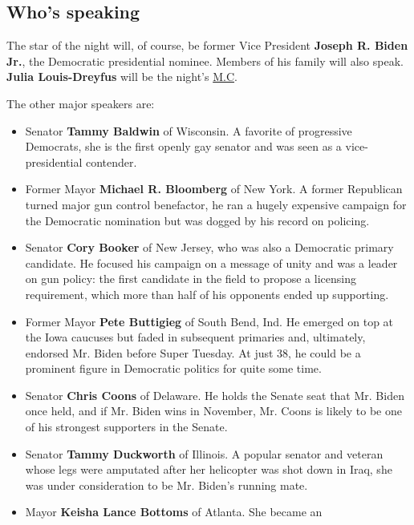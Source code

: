 \hypertarget{whos-speaking}{%
\subsection{Who's speaking}\label{whos-speaking}}

The star of the night will, of course, be former Vice President
\textbf{Joseph R. Biden Jr.}, the Democratic presidential nominee.
Members of his family will also speak. \textbf{Julia Louis-Dreyfus} will
be the night's
\href{https://www.nytimes3xbfgragh.onion/2020/08/17/us/elections/kerry-washington-julia-louis-dreyfus-eva-longoria-and-tracee-ellis-ross-will-mc-the-convention.html}{M.C}.

The other major speakers are:

\begin{itemize}
\item
  Senator \textbf{Tammy Baldwin} of Wisconsin. A favorite of progressive
  Democrats, she is the first openly gay senator and was seen as a
  vice-presidential contender.
\item
  Former Mayor \textbf{Michael R. Bloomberg} of New York. A former
  Republican turned major gun control benefactor, he ran a hugely
  expensive campaign for the Democratic nomination but was dogged by his
  record on policing.
\item
  Senator \textbf{Cory Booker} of New Jersey, who was also a Democratic
  primary candidate. He focused his campaign on a message of unity and
  was a leader on gun policy: the first candidate in the field to
  propose a licensing requirement, which more than half of his opponents
  ended up supporting.
\item
  Former Mayor \textbf{Pete Buttigieg} of South Bend, Ind. He emerged on
  top at the Iowa caucuses but faded in subsequent primaries and,
  ultimately, endorsed Mr. Biden before Super Tuesday. At just 38, he
  could be a prominent figure in Democratic politics for quite some
  time.
\item
  Senator \textbf{Chris Coons} of Delaware. He holds the Senate seat
  that Mr. Biden once held, and if Mr. Biden wins in November, Mr. Coons
  is likely to be one of his strongest supporters in the Senate.
\item
  Senator \textbf{Tammy Duckworth} of Illinois. A popular senator and
  veteran whose legs were amputated after her helicopter was shot down
  in Iraq, she was under consideration to be Mr. Biden's running mate.
\item
  Mayor \textbf{Keisha Lance Bottoms} of Atlanta. She became an

\end{itemize}
